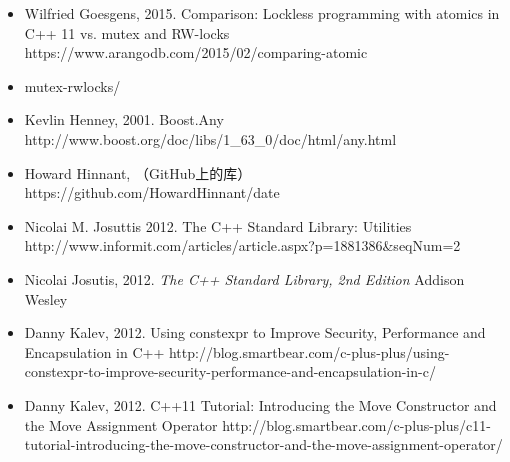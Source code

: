 \begin{itemize}

\item Wilfried Goesgens, 2015. Comparison: Lockless programming with atomics in C++ 11 vs. mutex and RW-locks https://\allowbreak{}www.\allowbreak{}arangodb.\allowbreak{}com/\allowbreak{}2015/\allowbreak{}02/\allowbreak{}comparing-\allowbreak{}atomic



\item mutex-rwlocks/



\item Kevlin Henney, 2001. Boost.Any http://\allowbreak{}www.\allowbreak{}boost.\allowbreak{}org/\allowbreak{}doc/\allowbreak{}libs/\allowbreak{}1\_\allowbreak{}63\_\allowbreak{}0/\allowbreak{}doc/\allowbreak{}html/\allowbreak{}any.\allowbreak{}html



\item Howard Hinnant, （GitHub上的库）https://\allowbreak{}github.\allowbreak{}com/\allowbreak{}HowardHinnant/\allowbreak{}date



\item Nicolai M. Josuttis 2012. The C++ Standard Library: Utilities http://\allowbreak{}www.\allowbreak{}informit.\allowbreak{}com/\allowbreak{}articles/\allowbreak{}article.\allowbreak{}aspx?p=1881386\&seqNum=2



\item Nicolai Josutis, 2012. \textit{The C++ Standard Library, 2nd Edition} Addison Wesley



\item Danny Kalev, 2012. Using constexpr to Improve Security, Performance and Encapsulation in C++ http://\allowbreak{}blog.\allowbreak{}smartbear.\allowbreak{}com/\allowbreak{}c-\allowbreak{}plus-\allowbreak{}plus/\allowbreak{}using-\allowbreak{}constexpr-\allowbreak{}to-\allowbreak{}improve-\allowbreak{}security-\allowbreak{}performance-\allowbreak{}and-\allowbreak{}encapsulation-\allowbreak{}in-\allowbreak{}c/



\item Danny Kalev, 2012. C++11 Tutorial: Introducing the Move Constructor and the Move Assignment Operator http://\allowbreak{}blog.\allowbreak{}smartbear.\allowbreak{}com/\allowbreak{}c-\allowbreak{}plus-\allowbreak{}plus/\allowbreak{}c11-\allowbreak{}tutorial-\allowbreak{}introducing-\allowbreak{}the-\allowbreak{}move-\allowbreak{}constructor-\allowbreak{}and-\allowbreak{}the-\allowbreak{}move-\allowbreak{}assignment-\allowbreak{}operator/



\end{itemize}
